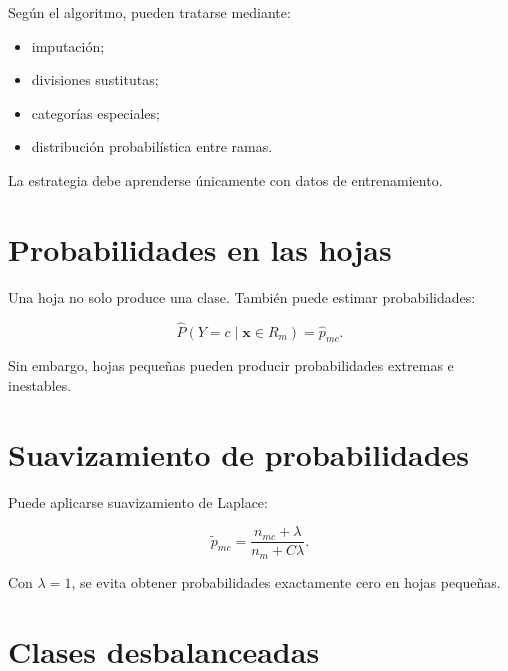 \documentclass[
  spanish,
  10.5pt,
  letterpaper,
  DIV=11,
  numbers=noendperiod,
  oneside,
  open=any]{scrreprt}
\providecommand{\tightlist}{%
  \setlength{\itemsep}{0pt}\setlength{\parskip}{0pt}}
\theoremstyle{definition}
\theoremstyle{definition}
\theoremstyle{plain}
\theoremstyle{remark}
\begin{document}

Según el algoritmo, pueden tratarse mediante:

\begin{itemize}
\tightlist
\item
  imputación;
\item
  divisiones sustitutas;
\item
  categorías especiales;
\item
  distribución probabilística entre ramas.
\end{itemize}

La estrategia debe aprenderse únicamente con datos de entrenamiento.

\section*{Probabilidades en las
hojas}\label{probabilidades-en-las-hojas}


Una hoja no solo produce una clase. También puede estimar
probabilidades:

\[
\widehat{P}(Y=c\mid\mathbf{x}\in R_m)
=
\widehat{p}_{mc}.
\]

Sin embargo, hojas pequeñas pueden producir probabilidades extremas e
inestables.

\section*{Suavizamiento de
probabilidades}\label{suavizamiento-de-probabilidades}


Puede aplicarse suavizamiento de Laplace:

\[
\widetilde{p}_{mc}
=
\frac{n_{mc}+\lambda}
{n_m+C\lambda}.
\]

Con \(\lambda=1\), se evita obtener probabilidades exactamente cero en
hojas pequeñas.

\section*{Clases desbalanceadas}\label{clases-desbalanceadas-1}

\end{document}
